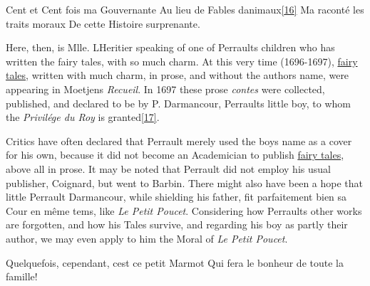 \documentclass[14pt,a4paper]{memoir}
\newcommand{\ul}[1]{\uline{#1}}
\begin{document}
{\textquotesingle Cent et Cent fois ma Gouvernante} {Au lieu de Fables
d\textquotesingle animaux\protect\hypertarget{4533318093929944247_33931-h-0.htm.xhtmlux5cux23FNanchor_16}{}{}\protect\hyperlink{4533318093929944247_33931-h-0.htm.xhtmlux5cux23Footnote_16}{{[}16{]}}}
{M\textquotesingle a raconté les traits moraux} {De cette Histoire
surprenante.\textquotesingle{}}

Here, then, is Mlle. L\textquotesingle Heritier speaking of one of
Perrault\textquotesingle s children who has written the fairy tales,
\textquotesingle with so much charm.\textquotesingle{} At this very time
(1696-1697), \ul{fairy tales}, \textquotesingle written with much
charm,\textquotesingle{} in prose, and without the
author\textquotesingle s name, were appearing in
Moetjens\textquotesingle{} \emph{Recueil}. In 1697 these prose
\emph{contes} were collected, published, and declared to be by P.
Darmancour, Perrault\textquotesingle s little boy, to whom the
\emph{Privilége du Roy} is
granted\protect\hypertarget{4533318093929944247_33931-h-0.htm.xhtmlux5cux23FNanchor_17}{}{}\protect\hyperlink{4533318093929944247_33931-h-0.htm.xhtmlux5cux23Footnote_17}{{[}17{]}}.

Critics have often declared that Perrault merely used the
boy\textquotesingle s name as a cover for his own, because it did not
become an Academician to publish \ul{fairy tales}, above all in prose.
It may be noted that Perrault did not employ his usual publisher,
Coignard, but went to Barbin. There might also have been a hope that
little Perrault Darmancour, while shielding his father,
\textquotesingle fit parfaitement bien sa Cour en même
tems,\textquotesingle{} like \emph{Le Petit Poucet}. Considering how
Perrault\textquotesingle s other works are forgotten, and how his Tales
survive, and regarding his boy as partly their author, we may even apply
to him the Moral of \emph{Le Petit Poucet}.

{\textquotesingle Quelquefois, cependant, c\textquotesingle est ce petit
Marmot} {Qui fera le bonheur de toute la famille!\textquotesingle{}}
\end{document}
